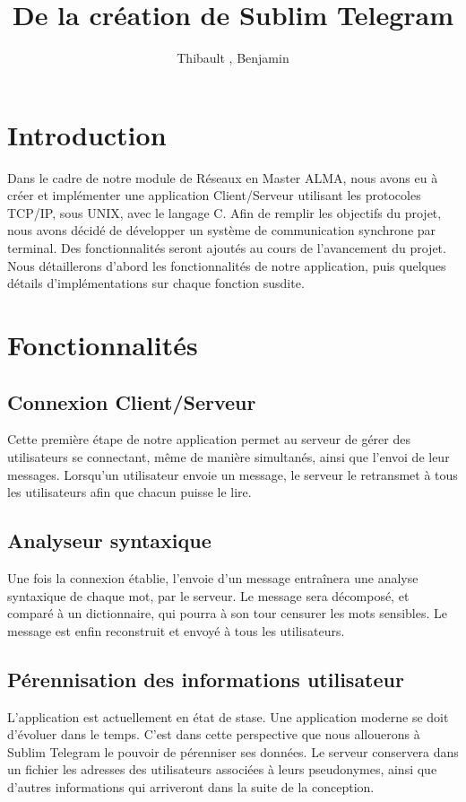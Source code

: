 \documentclass[a4paper, 12pt]{article}
\author{Thibault \bsc{Béziers la Fosse}, Benjamin \bsc{Moreau}}
\title{De la création de Sublim Telegram}
\begin{document}
\maketitle
\clearpage
\tableofcontents
\clearpage

\section{Introduction}
Dans le cadre de notre module de Réseaux en Master ALMA, nous avons eu à créer et implémenter une application Client/Serveur utilisant les protocoles TCP/IP, sous UNIX, avec le langage C. 
Afin de remplir les objectifs du projet, nous avons décidé de développer un système de communication synchrone par terminal. Des fonctionnalités seront ajoutés au cours de l'avancement du projet. 
Nous détaillerons d'abord les fonctionnalités de notre application, puis quelques détails d'implémentations sur chaque fonction susdite. 
\section{Fonctionnalités}
\subsection{Connexion Client/Serveur}
Cette première étape de notre application permet au serveur de gérer des utilisateurs se connectant, même de manière simultanés, ainsi que l'envoi de leur messages. Lorsqu'un utilisateur envoie un message, le serveur le retransmet à tous les utilisateurs afin que chacun puisse le lire. 
\subsection{Analyseur syntaxique}
Une fois la connexion établie, l'envoie d'un message entraînera une analyse syntaxique de chaque mot, par le serveur. Le message sera décomposé, et comparé à un dictionnaire, qui pourra à son tour censurer les mots sensibles. Le message est enfin reconstruit et envoyé à tous les utilisateurs.  
\subsection{Pérennisation des informations utilisateur}
L'application est actuellement en état de stase. Une application moderne se doit d'évoluer dans le temps. C'est dans cette perspective que nous allouerons à Sublim Telegram le pouvoir de pérenniser ses données. Le serveur conservera dans un fichier les adresses des utilisateurs associées à leurs pseudonymes, ainsi que d'autres informations qui arriveront dans la suite de la conception. 
\end{document}
